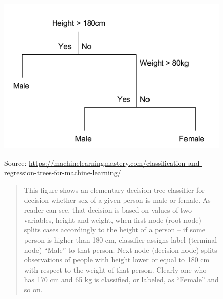 \documentclass[12pt, twoside,openany]{book} %
\begin{document}
\begin{figure}[H]
\includegraphics[width=\textwidth]{decisiontree.png}
\label{Figure 1.1}
{\small Source: \url{https://machinelearningmastery.com/classification-and-regression-trees-for-machine-learning/} \newline
\begin{quotation}
This figure shows an elementary decision tree classifier for decision whether sex of a given person is male or female. As reader can see, that decision is based on values of two variables, height and weight, when first node (root node) splits cases accordingly to the height of a person – if some person is higher than 180 cm, classifier assigns label (terminal node) “Male” to that person. Next node (decision node) splits observations of people with height lower or equal to 180 cm with respect to the weight of that person. Clearly one who has 170 cm and 65 kg is classified, or labeled, as “Female” and so on.
\end{quotation}
}
\end{figure}
\end{document}
